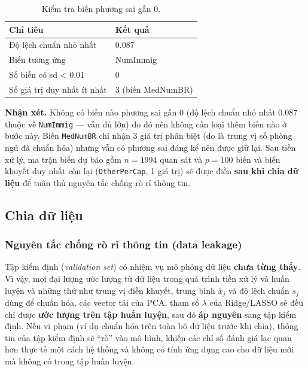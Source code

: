 \begin{longtable}[t]{ll}
\caption{\label{tab:tien-xu-ly}Kiểm tra biến phương sai gần 0.}\\
\toprule
Chỉ tiêu & Kết quả\\
\midrule
Độ lệch chuẩn nhỏ nhất & 0.087\\
Biến tương ứng & NumImmig\\
Số biến có sd < 0.01 & 0\\
Số giá trị duy nhất ít nhất & 3 (biến MedNumBR)\\
\bottomrule
\end{longtable}

\textbf{Nhận xét.} Không có biến nào phương sai gần 0 (độ lệch chuẩn nhỏ
nhất 0.087 thuộc về \texttt{NumImmig} --- vẫn đủ lớn) do đó nên không
cần loại thêm biến nào ở bước này. Biến \texttt{MedNumBR} chỉ nhận 3 giá
trị phân biệt (do là trung vị số phòng ngủ đã chuẩn hóa) nhưng vẫn có
phương sai đáng kể nên được giữ lại. Sau tiền xử lý, ma trận biến dự báo
gồm \(n = 1994\) quan sát và \(p = 100\) biến và biến khuyết duy nhất
còn lại (\texttt{OtherPerCap}, 1 giá trị) sẽ được điền \textbf{sau khi
chia dữ liệu} để tuân thủ nguyên tắc chống rò rỉ thông tin.

\subsection{Chia dữ liệu}\label{chia-dux1eef-liux1ec7u}

\subsubsection{Nguyên tắc chống rò rỉ thông tin (data
leakage)}\label{nguyuxean-tux1eafc-chux1ed1ng-ruxf2-rux1ec9-thuxf4ng-tin-data-leakage}

Tập kiểm định (\emph{validation set}) có nhiệm vụ mô phỏng dữ liệu
\textbf{chưa từng thấy}. Vì vậy, mọi đại lượng ước lượng từ dữ liệu
trong quá trình tiền xử lý và huấn luyện và những thứ như trung vị điền
khuyết, trung bình \(\bar{x}_j\) và độ lệch chuẩn \(s_j\) dùng để chuẩn
hóa, các vector tải của PCA, tham số \(\lambda\) của Ridge/LASSO sẽ đều
chỉ được \textbf{ước lượng trên tập huấn luyện}, sau đó \textbf{áp
nguyên} sang tập kiểm định. Nếu vi phạm (ví dụ chuẩn hóa trên toàn bộ dữ
liệu trước khi chia), thông tin của tập kiểm định sẽ ``rò'' vào mô hình,
khiến các chỉ số đánh giá lạc quan hơn thực tế một cách hệ thống và
không có tính ứng dụng cao cho dữ liệu mới mà không có trong tập huấn
luyện.

